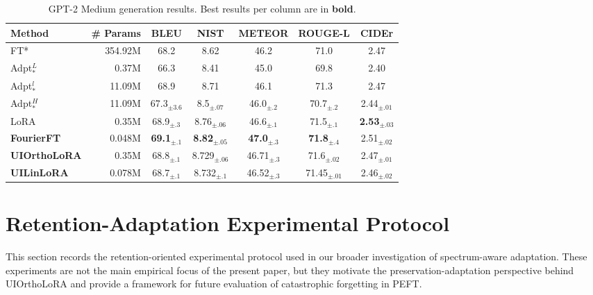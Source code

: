 \documentclass{article}
\begin{document}
\begin{table}[ht]
\centering
\caption{GPT-2 Medium generation results. Best results per column are in \textbf{bold}.}
\label{tab:gpt2_generation_appendix}
\begin{adjustbox}{max width=\linewidth}
\begin{tabular}{@{}l r c c c c c@{}}
\toprule
\textbf{Method} & \textbf{\# Params} & \textbf{BLEU} & \textbf{NIST} & \textbf{METEOR} & \textbf{ROUGE-L} & \textbf{CIDEr} \\
\midrule
FT*              & 354.92M & 68.2           & 8.62           & 46.2           & 71.0           & 2.47 \\
Adpt$^L_*$       & 0.37M   & 66.3           & 8.41           & 45.0           & 69.8           & 2.40 \\
Adpt$^l_*$       & 11.09M  & 68.9           & 8.71           & 46.1           & 71.3           & 2.47 \\
Adpt$^H_*$       & 11.09M  & 67.3$_{\pm3.6}$ & 8.5$_{\pm.07}$ & 46.0$_{\pm.2}$ & 70.7$_{\pm.2}$ & 2.44$_{\pm.01}$ \\
LoRA             & 0.35M   & 68.9$_{\pm.3}$  & 8.76$_{\pm.06}$ & 46.6$_{\pm.1}$ & 71.5$_{\pm.1}$ & \textbf{2.53}$_{\pm.03}$ \\
\textbf{FourierFT}     & 0.048M  & \textbf{69.1}$_{\pm.1}$ & \textbf{8.82}$_{\pm.05}$ & \textbf{47.0}$_{\pm.3}$ & \textbf{71.8}$_{\pm.4}$ & 2.51$_{\pm.02}$ \\
\textbf{UIOrthoLoRA}   & 0.35M   & 68.8$_{\pm.1}$ & 8.729$_{\pm.06}$ & 46.71$_{\pm.3}$ & 71.6$_{\pm.02}$ & 2.47$_{\pm.01}$ \\
\textbf{UILinLoRA}     & 0.078M  & 68.7$_{\pm.1}$ & 8.732$_{\pm.1}$ & 46.52$_{\pm.3}$ & 71.45$_{\pm.01}$ & 2.46$_{\pm.02}$ \\
\bottomrule
\end{tabular}
\end{adjustbox}
\end{table}



\section{Retention-Adaptation Experimental Protocol}
\label{app:retention_adaptation_protocol}

This section records the retention-oriented experimental protocol used in our
broader investigation of spectrum-aware adaptation. These experiments are not
the main empirical focus of the present paper, but they motivate the
preservation-adaptation perspective behind UIOrthoLoRA and provide a framework
for future evaluation of catastrophic forgetting in PEFT.
\end{document}

